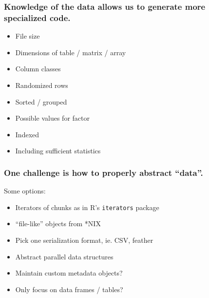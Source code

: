 \documentclass{beamer}
\begin{document}
\begin{frame}

    \frametitle{Knowledge of the data allows us to generate more
    specialized code.}

    \begin{itemize}

	\item File size
	\item Dimensions of table / matrix / array
	\item Column classes
	\item Randomized rows
	\item Sorted / grouped
	\item Possible values for factor
	\item Indexed
	\item Including sufficient statistics

    \end{itemize}


\end{frame}
\begin{frame}[fragile]

    \frametitle{One challenge is how to properly abstract ``data''.}

    Some options:

    \begin{itemize}
        \item Iterators of chunks as in R's \texttt{iterators} package
        \item ``file-like'' objects from *NIX
        \item Pick one serialization format, ie. CSV, feather
        \item Abstract parallel data structures
    \end{itemize}

    \pause

    \begin{itemize}
        \item Maintain custom metadata objects?
        \item Only focus on data frames / tables?
    \end{itemize}

%
%
%
%
%
%    
%


\end{frame}
\end{document}

